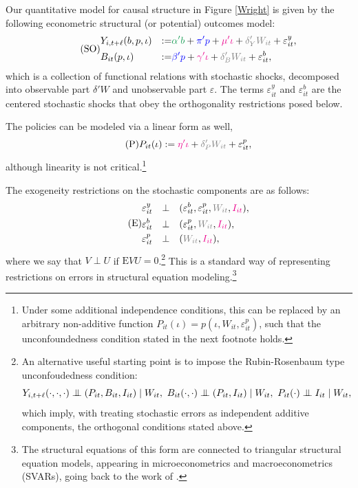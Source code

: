 \documentclass[11pt,reqno,letter]{amsart}
\theoremstyle{definition}
\newcommand\indep{\protect\mathpalette{\protect\independenT}{\perp}}
\def\independenT#1#2{\mathrel{\setbox0\hbox{$#1#2$}%
    \copy0\kern-\wd0\mkern4mu\box0}}
\newcommand{\Ep}{{\mathrm{E}}}
\def\bcolor{\color{ForestGreen}}
\def\pcolor{\color{blue}}
\def\icolor{\color{magenta}}
\def\wcolor{\color{gray}}
\begin{document}
Our quantitative model for causal structure in Figure \ref{Wright} is given by the following econometric structural (or potential) outcomes model:\begin{equation} \label{eqn:SEM1} \tag{SO}
  \begin{aligned}
   &  Y_{i,t+\ell} (b,p,\iota) &:=& {\bcolor \alpha ' b}  +  {\pcolor \pi 'p} +
    {\icolor \mu'\iota } + {\wcolor \delta_Y 'W_{it}} + \varepsilon^y_{it}, \\
   &  B_{it} (p,\iota) &:= & {\pcolor \beta'p } + {\icolor \gamma'\iota} +      {\wcolor\delta_B 'W_{it} } + \varepsilon^b_{it},
      \end{aligned}
 \end{equation}
which is a collection of functional relations with stochastic shocks, decomposed into observable part $\delta' W$ and unobservable part $\varepsilon$.
The terms $\varepsilon^y_{it}$ and  $\varepsilon^b_{it} $  are the centered stochastic shocks that obey the orthogonality restrictions posed below.


The policies can be modeled via a linear form as well,
\begin{equation}\label{eq:Policy} \tag{P}
 P_{it}   (\iota) :=  {\icolor\eta'\iota} + {\wcolor \delta_P' W_{it}} +   \varepsilon^p_{it},   \end{equation}
although  linearity is not critical.\footnote{Under some additional independence conditions, this
can be replaced by an arbitrary non-additive function $P_{it}(\iota) = p (\iota, W_{it},  \varepsilon^p_{it})$, such that the unconfoundedness condition stated in the next footnote holds.}


The exogeneity restrictions on the stochastic components are as follows:
\begin{equation}\label{eqn:SEM2} \tag{E}
\begin{aligned}
   & \varepsilon^y_{it} &  \perp &  \quad (\varepsilon^b_{it}, \varepsilon^p_{it}, {\wcolor W_{it}}, {\icolor I_{it}}), \\
&  \varepsilon^b_{it}  & \perp & \quad  (\varepsilon^p_{it}, {\wcolor W_{it}}, {\icolor I_{it}}), \\
&   \varepsilon^p_{it} &  \perp &  \quad ({\wcolor W_{it}}, {\icolor I_{it}}),
\end{aligned}
\end{equation}
where we say that $V \perp U$ if $\Ep VU = 0$.\footnote{ An alternative useful
starting point is to impose the Rubin-Rosenbaum type unconfoudedness condition:
$$
Y_{i,t+\ell} (\cdot,\cdot,\cdot)  \indep (P_{it}, B_{it}, I_{it})  \mid W_{it}, \
B_{it} (\cdot,\cdot)  \indep (P_{it}, I_{it})  \mid W_{it}, \
 P_{it} (\cdot)  \indep  I_{it}  \mid W_{it},
$$
which imply, with treating stochastic errors as independent additive components, the orthogonal conditions stated above.} This is a standard way of representing restrictions on errors in structural equation modeling.\footnote{The structural equations of this form are connected to triangular structural equation models, appearing in microeconometrics and macroeconometrics (SVARs), going back to the work of  \cite{strotz1960recursive}.}
\end{document}
